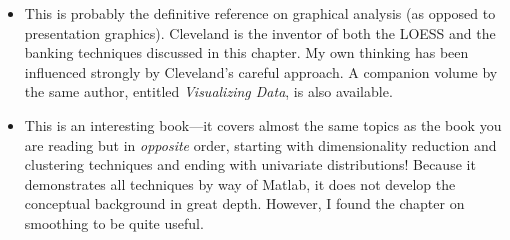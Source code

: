 \begin{itemize}

\item {}
  This is probably the definitive reference on graphical analysis (as
  opposed to presentation graphics). Cleveland is the inventor of both
  the LOESS and the banking techniques discussed in this chapter. My
  own thinking has been influenced strongly by Cleveland's careful
  approach.  A companion volume by the same author, entitled
  \emph{Visualizing Data}, is also available.

\item {}
  This is an interesting book---it covers almost the same topics as
  the book you are reading but in \emph{opposite} order, starting with
  dimensionality reduction and clustering techniques and ending with
  univariate distributions! Because it demonstrates all techniques by
  way of Matlab, it does not develop the conceptual background in
  great depth. However, I found the chapter on smoothing to be quite
  useful.
\end{itemize}

